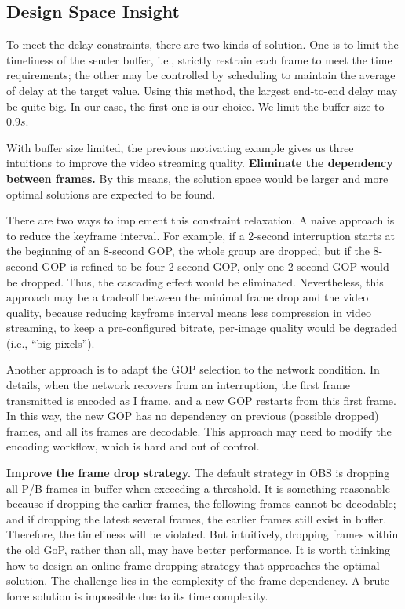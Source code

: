 \subsection{Design Space Insight}
To meet the delay constraints, there are two kinds of solution. One is to limit the timeliness of the sender buffer, i.e., strictly restrain each frame to meet the time requirements; the other may be controlled by scheduling to maintain the average of delay at the target value. Using this method, the largest end-to-end delay may be quite big. In our case, the first one is our choice. We limit the buffer size to $0.9s$.

With buffer size limited, the previous motivating example gives us three intuitions to improve the video streaming quality.
\textbf{Eliminate the dependency between frames.}
By this means, the solution space would be larger and more optimal solutions are expected to be found.

There are two ways to implement this constraint relaxation. A naive approach is to reduce the keyframe interval. For example, if a 2-second interruption starts at the beginning of an 8-second GOP, the whole group are dropped; but if the 8-second GOP is refined to be four 2-second GOP, only one 2-second GOP would be dropped. Thus, the cascading effect would be eliminated. Nevertheless, this approach may be a tradeoff between the minimal frame drop and the video quality, because reducing keyframe interval means less compression in video streaming, to keep a pre-configured bitrate, per-image quality would be degraded (i.e., ``big pixels'').

Another approach is to adapt the GOP selection to the network condition. In details, when the network recovers from an interruption, the first frame transmitted is encoded as I frame, and a new GOP restarts from this first frame. In this way, the new GOP has no dependency on previous (possible dropped) frames, and all its frames are decodable. This approach may need to modify the encoding workflow, which is hard and out of control.

\textbf{Improve the frame drop strategy.} The default strategy in OBS is dropping all P/B frames in buffer when exceeding a threshold. It is something reasonable because if dropping the earlier frames, the following frames cannot be decodable; and if dropping the latest several frames, the earlier frames still exist in buffer. Therefore, the timeliness will be violated. But intuitively, dropping frames within the old GoP, rather than all, may have better performance. It is worth thinking how to design an online frame dropping strategy that approaches the optimal solution. The challenge lies in the complexity of the frame dependency. A brute force solution is impossible due to its time complexity.

